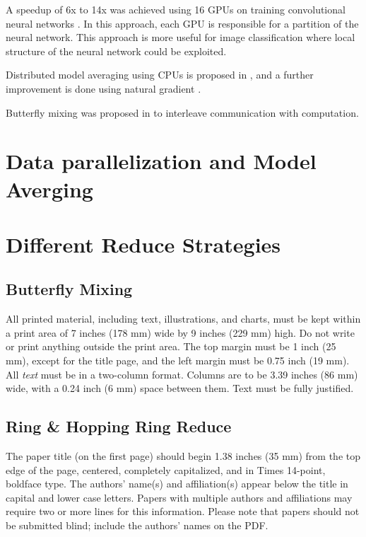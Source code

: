 \documentclass{article}
\begin{document}
A speedup of 6x to 14x was achieved using 16 GPUs on training convolutional neural networks \cite{coates2013deep}. In this approach,
each GPU is responsible for a partition of the neural network. This approach is more useful for image classification where 
local structure of the neural network could be exploited.

Distributed model averaging using CPUs is proposed in \cite{zhang2014improving},
and a further improvement is done using natural gradient \cite{povey2014parallel}.


Butterfly mixing was proposed in \cite{zhao2013butterfly} to interleave communication with computation.


\section{Data parallelization and Model Averging}

\section{Different Reduce Strategies}

\subsection{Butterfly Mixing}

All printed material, including text, illustrations, and charts, must be kept
within a print area of 7 inches (178 mm) wide by 9 inches (229 mm) high. Do
not write or print anything outside the print area. The top margin must be 1
inch (25 mm), except for the title page, and the left margin must be 0.75 inch
(19 mm).  All {\it text} must be in a two-column format. Columns are to be 3.39
inches (86 mm) wide, with a 0.24 inch (6 mm) space between them. Text must be
fully justified.

\subsection{Ring \& Hopping Ring Reduce}

The paper title (on the first page) should begin 1.38 inches (35 mm) from the
top edge of the page, centered, completely capitalized, and in Times 14-point,
boldface type.  The authors' name(s) and affiliation(s) appear below the title
in capital and lower case letters.  Papers with multiple authors and
affiliations may require two or more lines for this information. Please note
that papers should not be submitted blind; include the authors' names on the
PDF.
\end{document}
